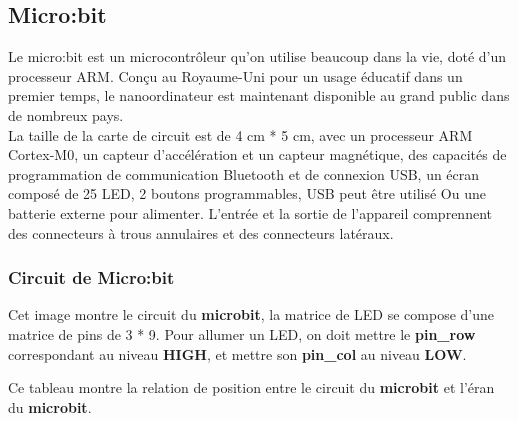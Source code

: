 \documentclass[14px]{article}
\begin{document}
\subsection{Micro:bit}
Le micro:bit est un microcontrôleur qu'on utilise beaucoup dans la vie, doté d'un processeur ARM. Conçu au Royaume-Uni pour un usage éducatif dans un premier temps, le nanoordinateur est maintenant disponible au grand public dans de nombreux pays.\\

La taille de la carte de circuit est de 4 cm * 5 cm, avec un processeur ARM Cortex-M0, un capteur d'accélération et un capteur magnétique, des capacités de programmation de communication Bluetooth et de connexion USB, un écran composé de 25 LED, 2 boutons programmables, USB peut être utilisé Ou une batterie externe pour alimenter. L'entrée et la sortie de l'appareil comprennent des connecteurs à trous annulaires et des connecteurs latéraux.

\subsubsection{Circuit de Micro:bit}
Cet image montre le circuit du \textbf{microbit}, la matrice de LED se compose d'une matrice de pins de 3 * 9. Pour allumer un LED, on doit mettre le \textbf{pin\_row} correspondant au niveau \textbf{HIGH}, et mettre son \textbf{pin\_col} au niveau \textbf{LOW}.

\begin{figure}
\end{figure}

Ce tableau montre la relation de position entre le circuit du  \textbf{microbit} et l'éran du \textbf{microbit}.
\end{document}
